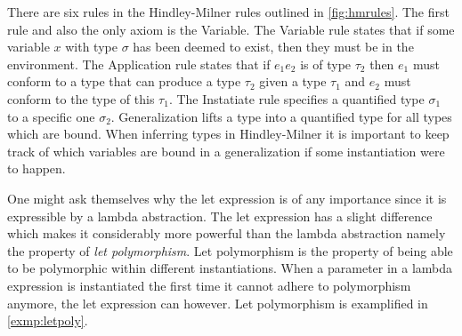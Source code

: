 \documentclass[11pt,oneside,a4paper]{report}
\begin{document}
There are six rules in the Hindley-Milner rules outlined in \autoref{fig:hmrules}.
The first rule and also the only axiom is the Variable.
The Variable rule states that if some variable $x$ with type $\sigma$ has been deemed to exist, then they must be in the environment.
The Application rule states that if $e_1 e_2$ is of type $\tau_2$ then $e_1$ must conform to a type that can produce a type $\tau_2$ given a type $\tau_1$ and $e_2$ must conform to the type of this $\tau_1$.
The Instatiate rule specifies a quantified type $\sigma_1$ to a specific one $\sigma_2$.
Generalization lifts a type into a quantified type for all types which are bound.
When inferring types in Hindley-Milner it is important to keep track of which variables are bound in a generalization if some instantiation were to happen.

One might ask themselves why the let expression is of any importance since it is expressible by a lambda abstraction.
The let expression has a slight difference which makes it considerably more powerful than the lambda abstraction namely the property of \textit{let polymorphism}.
Let polymorphism is the property of being able to be polymorphic within different instantiations.
When a parameter in a lambda expression is instantiated the first time it cannot adhere to polymorphism anymore, the let expression can however.
Let polymorphism is examplified in \autoref{exmp:letpoly}.
\end{document}
